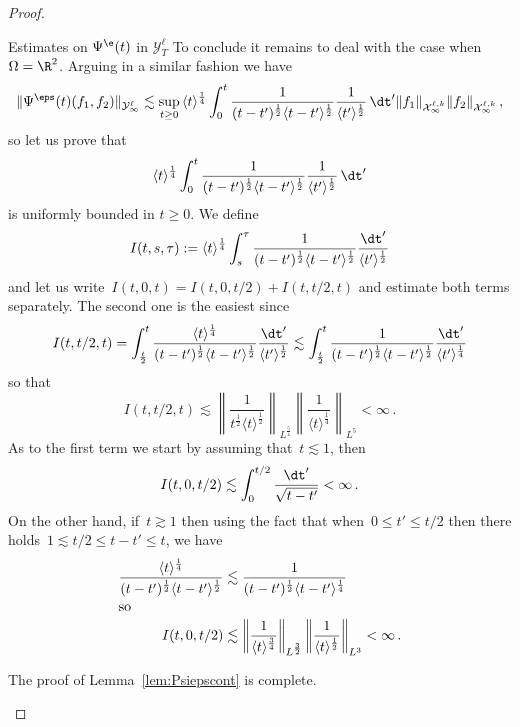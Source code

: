 \begin{proof}
\begin{laststep}{Estimates on $\Psi^\e(t)$ in $\mathcal{Y}^\ell_T$}
To conclude it remains to deal with the case when~$\Omega=\R^2$. Arguing in a similar fashion we have
\[
\|\Psi^\eps(t) (f_1,f_2) \|_{\mathcal{Y}^{\ell}_\infty} \lesssim \sup_{t \ge 0} \, \langle t \rangle^{\frac14} \int_0^t \frac{1}{(t-t')^\frac12 \langle t-t' \rangle^\frac12} \frac{1}{\langle t' \rangle^\frac12} \, \dt' \|f_1\|_{\mathcal{X}^{\ell,k}_\infty} \|f_2\|_{\mathcal{X}^{\ell,k}_\infty} \,,
\]
so let us prove that
\[
\langle t \rangle^{\frac14} \int_0^t \frac{1}{(t-t')^\frac12\langle t-t' \rangle^\frac12} \frac{1}{\langle t' \rangle^\frac12} \, \dt'
\]
is uniformly bounded in $t \ge 0$. We define
\[
I(t,s,\tau):= \langle t \rangle^{\frac14} \int_s^\tau \frac{1}{(t-t')^{\frac12}\langle t-t' \rangle^{\frac12}}\frac{\dt'}{\langle t' \rangle^{\frac12}}
\]
and let us write~$ I(t,0,t)= I(t,0,t/2)+ I(t,t/2,t)$ and estimate both terms separately. The second one is the easiest since
\begin{align*}
I(t,t/2,t) &= \int_{\frac t2}^t \frac{\langle t \rangle^{\frac14} }{(t-t')^{\frac12}\langle t-t' \rangle^{\frac12}}\frac{\dt'}{\langle t' \rangle^{\frac12}} \lesssim \int_{\frac t2}^t \frac{1}{(t-t')^{\frac12}\langle t-t' \rangle^{\frac12}}\frac{\dt'}{\langle t' \rangle^{\frac14}} \\
\end{align*}
so that
\[
I(t,t/2,t) \lesssim \left\| \frac{1}{{t^{\frac12}\langle t \rangle^{\frac12}}} \right\|_{L^{\frac54} } \left\| \frac{1}{{\langle t \rangle^\frac14}} \right\|_{L^5 } < \infty\,.
\]
As to the first term we start by assuming that~$t\lesssim 1$, then
\[
I(t,0,t/2) \lesssim \int_0^{t/2} \frac{\dt'}{\sqrt{t-t'}} < \infty\,.
\]
On the other hand, if~$t\gtrsim 1$ then using the fact that when~$0\leq t'\leq t/2$ then there holds~$1 \lesssim t/2\leq t-t'\leq t$, we have
\begin{align*}
\frac{\langle t \rangle^{\frac14} }{(t-t')^\frac12 \langle t-t' \rangle^\frac12}&\lesssim \frac{1}{(t-t')^\frac12 \langle t-t' \rangle^\frac14}\\
\intertext{so}
I(t,0,t/2) &\lesssim \left\| \frac{1}{{\langle t \rangle^{\frac34}}} \right\|_{L^{\frac32} } \left\| \frac{1}{{\langle t \rangle^{\frac12}} }\right\|_{L^3 } < \infty\,.
\end{align*}

The proof of Lemma~\ref{lem:Psiepscont} is complete.
\end{laststep}
\let\qed\relax
\end{proof}



